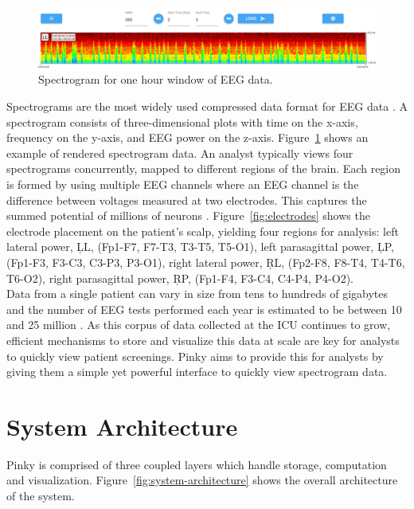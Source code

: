 \begin{figure}[h]
\begin{center}
\includegraphics[scale=0.35]{./img/eeg-view.png}
\caption{Spectrogram for one hour window of EEG data.}
\label{fig:eeg-view}
\end{center}
\end{figure}

Spectrograms are the most widely used compressed data format for EEG data
\cite{ceeg-1}. A spectrogram consists of three-dimensional plots with time on
the x-axis, frequency on the y-axis, and EEG power on the z-axis.
Figure~\ref{fig:eeg-view} shows an example of rendered spectrogram data. An
analyst typically views four spectrograms concurrently, mapped to different
regions of the brain. Each region is formed by using multiple EEG channels
where an EEG channel is the difference between voltages measured at two
electrodes. This captures the summed potential of millions of neurons
\cite{eeg-ml}.  Figure~\ref{fig:electrodes} shows the electrode placement on
the patient's scalp, yielding four regions for analysis: left lateral power,
\c{LL}, (Fp1-F7, F7-T3, T3-T5, T5-O1), left parasagittal power, \c{LP},
(Fp1-F3, F3-C3, C3-P3, P3-O1), right lateral power, \c{RL}, (Fp2-F8, F8-T4,
T4-T6, T6-O2), right parasagittal power, \c{RP}, (Fp1-F4, F3-C4, C4-P4, P4-O2).
\\

Data from a single patient can vary in size from tens to hundreds of gigabytes
and the number of EEG tests performed each year is estimated to be between 10
and 25 million \cite{eeg-scale}. As this corpus of data collected at the ICU
continues to grow, efficient mechanisms to store and visualize this data at
scale are key for analysts to quickly view patient screenings. Pinky aims to
provide this for analysts by giving them a simple yet powerful interface to
quickly view spectrogram data.

\section{System Architecture}

Pinky is comprised of three coupled layers which handle storage, computation
and visualization. Figure~\ref{fig:system-architecture} shows the overall
architecture of the system.


